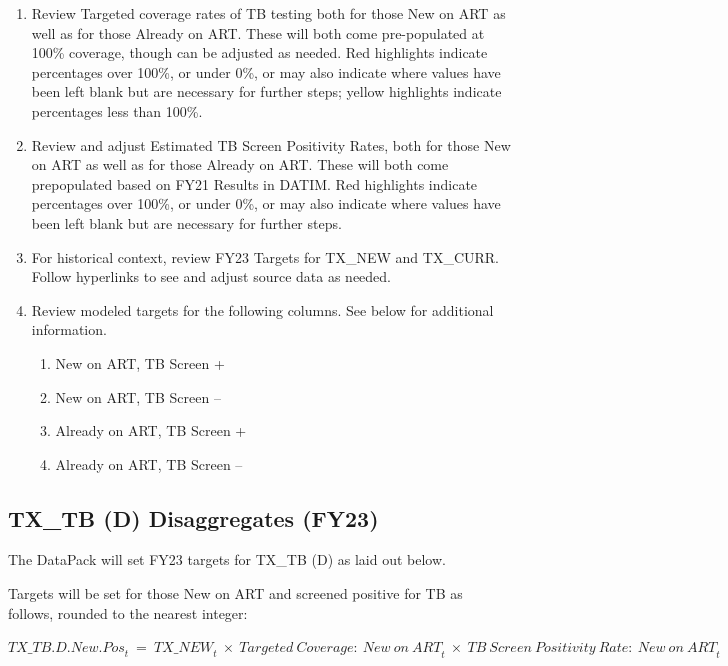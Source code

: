 \documentclass[
  openany]{book}
\begin{document}
\begin{enumerate}
\def\labelenumi{\arabic{enumi}.}
\item
  Review Targeted coverage rates of TB testing both for those New on
  ART as well as for those Already on ART. These will both come
  pre-populated at 100\% coverage, though can be adjusted as needed.
  Red highlights indicate percentages over 100\%, or under 0\%, or may
  also indicate where values have been left blank but are necessary
  for further steps; yellow highlights indicate percentages less than
  100\%.
\item
  Review and adjust Estimated TB Screen Positivity Rates, both for
  those New on ART as well as for those Already on ART. These will
  both come prepopulated based on FY21 Results in DATIM. Red
  highlights indicate percentages over 100\%, or under 0\%, or may also
  indicate where values have been left blank but are necessary for
  further steps.
\item
  For historical context, review FY23 Targets for TX\_NEW and TX\_CURR.
  Follow hyperlinks to see and adjust source data as needed.
\item
  Review modeled targets for the following columns. See below for
  additional information.

  \begin{enumerate}
  \def\labelenumii{\alph{enumii}.}
  \item
    New on ART, TB Screen +
  \item
    New on ART, TB Screen --
  \item
    Already on ART, TB Screen +
  \item
    Already on ART, TB Screen --
  \end{enumerate}
\end{enumerate}

\hypertarget{tx_tb-d-disaggregates-fy23}{%
\subsection{TX\_TB (D) Disaggregates (FY23)}\label{tx_tb-d-disaggregates-fy23}}

The DataPack will set FY23 targets for TX\_TB (D) as laid out below.

Targets will be set for those New on ART and screened positive for TB as
follows, rounded to the nearest integer:

\begin{center} ${TX\_ TB.D.New.Pos}_{t}\  = \ {TX\_ NEW}_{t}\  \times \ {Targeted\ Coverage:\ New\ on\ ART}_{t}\  \times \ {TB\ Screen\ Positivity\ Rate:\ New\ on\ ART}_{t}$ \end{center}
\end{document}
